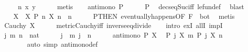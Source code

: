 \begin{isabellebody}
\ \ \ \ \ n\ x\ y\isanewline
\ \ \ \ \isamarkupfalse%
\ metis\isanewline
\ \ \isamarkupfalse%
\ {\isachardoublequoteopen}antimono\ P{\isachardoublequoteclose}\isanewline
\ \ \ \ \isamarkupfalse%
\ P{\isacharparenleft}{\kern0pt}{}{\isacharparenright}{\kern0pt}\ \isamarkupfalse%
\ decseq{\isacharunderscore}{\kern0pt}Suc{\isacharunderscore}{\kern0pt}iff\ le{\isacharunderscore}{\kern0pt}fun{\isacharunderscore}{\kern0pt}def\ \isamarkupfalse%
\ blast\isanewline
\isanewline
\ \ \isamarkupfalse%
\ X\ \ X{\isacharcolon}{\kern0pt}\ {\isachardoublequoteopen}P\ n\ {\isacharparenleft}{\kern0pt}X\ n{\isacharparenright}{\kern0pt}{\isachardoublequoteclose}\ \ n\isanewline
\ \ \ \ \isamarkupfalse%
\ P{\isacharparenleft}{\kern0pt}{}{\isacharparenright}{\kern0pt}{\isacharbrackleft}{\kern0pt}THEN\ eventually{\isacharunderscore}{\kern0pt}happens{\isacharprime}{\kern0pt}{\isacharbrackleft}{\kern0pt}OF\ {\isacartoucheopen}F\ {\isasymnoteq}\ bot{\isacartoucheclose}{\isacharbrackright}{\kern0pt}{\isacharbrackright}{\kern0pt}\ \isamarkupfalse%
\ metis\isanewline
\ \ \isamarkupfalse%
\ {\isachardoublequoteopen}Cauchy\ X{\isachardoublequoteclose}\isanewline
\ \ \ \ \isamarkupfalse%
\ metric{\isacharunderscore}{\kern0pt}Cauchy{\isacharunderscore}{\kern0pt}iff{}\ inverse{\isacharunderscore}{\kern0pt}eq{\isacharunderscore}{\kern0pt}divide\isanewline
\ \ \isamarkupfalse%
\ {\isacharparenleft}{\kern0pt}intro\ exI\ allI\ impI{\isacharparenright}{\kern0pt}\isanewline
\ \ \ \ \isamarkupfalse%
\ j\ m\ n\ {\isacharcolon}{\kern0pt}{\isacharcolon}{\kern0pt}\ nat\isanewline
\ \ \ \ \isamarkupfalse%
\ {\isachardoublequoteopen}j\ {\isasymle}\ m{\isachardoublequoteclose}\ {\isachardoublequoteopen}j\ {\isasymle}\ n{\isachardoublequoteclose}\isanewline
\ \ \ \ \isamarkupfalse%
\ {\isacartoucheopen}antimono\ P{\isacartoucheclose}\ X\ \isamarkupfalse%
\ {\isachardoublequoteopen}P\ j\ {\isacharparenleft}{\kern0pt}X\ m{\isacharparenright}{\kern0pt}{\isachardoublequoteclose}\ {\isachardoublequoteopen}P\ j\ {\isacharparenleft}{\kern0pt}X\ n{\isacharparenright}{\kern0pt}{\isachardoublequoteclose}\isanewline
\ \ \ \ \ \ \isamarkupfalse%
\ {\isacharparenleft}{\kern0pt}auto\ simp{\isacharcolon}{\kern0pt}\ antimono{\isacharunderscore}{\kern0pt}def{\isacharparenright}{\kern0pt}\isanewline

\end{isabellebody}
